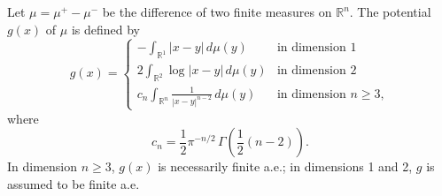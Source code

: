 Let $\mu = \mu^+ - \mu^-$ be the difference of two finite measures on $\mathbb{R}^n$. The potential $g(x)$ of $\mu$ is defined by
$$g(x) = \begin{cases}
\displaystyle -\int_{\mathbb{R}^1} |x-y| \, d\mu(y) & \text{in dimension } 1 \\[12pt]
\displaystyle 2 \int_{\mathbb{R}^2} \log |x-y| \, d\mu(y) & \text{in dimension } 2 \\[12pt]
\displaystyle c_n \int_{\mathbb{R}^n} \frac{1}{|x-y|^{n-2}} \, d\mu(y) & \text{in dimension } n \geq 3,
\end{cases}$$
where
$$c_n = \frac{1}{2} \pi^{-n/2} \, \Gamma\!\left(\frac{1}{2}(n-2)\right).$$
In dimension $n \geq 3$, $g(x)$ is necessarily finite a.e.; in dimensions 1 and 2, $g$ is assumed to be finite a.e.
